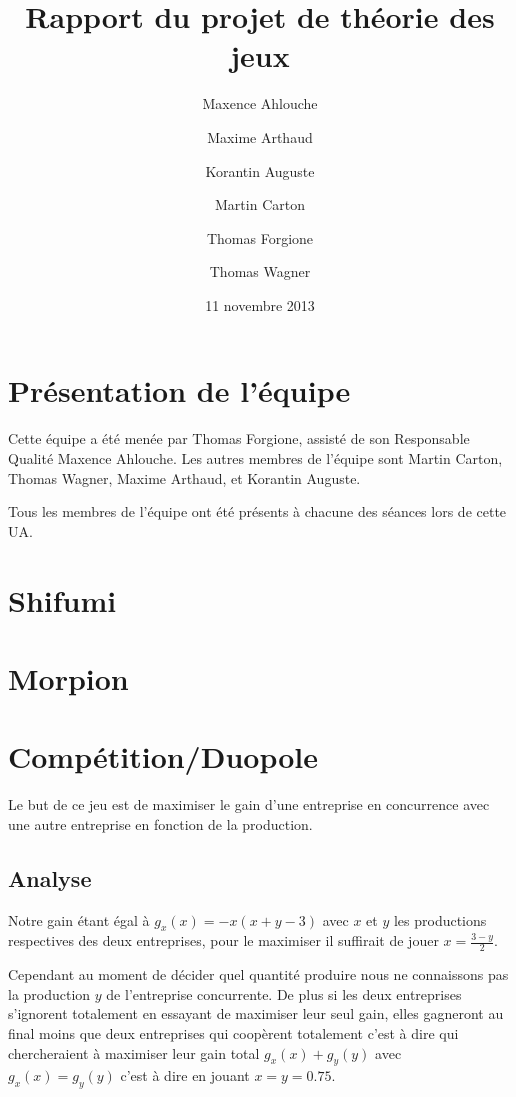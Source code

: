 \documentclass{scrartcl}
\begin{document}
\title{Rapport du projet de théorie des jeux}
\author{Maxence Ahlouche \and Maxime Arthaud \and Korantin Auguste
          \and Martin Carton \and Thomas Forgione \and Thomas Wagner}
\date{11 novembre 2013}
\maketitle
\tableofcontents
\lstlistoflistings
\newpage

\section{Présentation de l'équipe}
  Cette équipe a été menée par Thomas Forgione, assisté de son Responsable
  Qualité Maxence Ahlouche. Les autres membres de l'équipe sont Martin Carton,
  Thomas Wagner, Maxime Arthaud, et Korantin Auguste.

  Tous les membres de l'équipe ont été présents à chacune des séances lors de
  cette UA.

\section{Shifumi}
\section{Morpion}
\section{Compétition/Duopole}
  Le but de ce jeu est de maximiser le gain d'une entreprise en concurrence
  avec une autre entreprise en fonction de la production.

  \subsection{Analyse}
    Notre gain étant égal à $g_x(x) = -x(x+y-3)$ avec $x$ et $y$ les
    productions respectives des deux entreprises, pour le maximiser il
    suffirait de jouer $x=\frac{3-y}{2}$.
    
    Cependant au moment de décider quel quantité produire nous ne connaissons
    pas la production $y$ de l'entreprise concurrente. De plus si les deux
    entreprises s'ignorent totalement en essayant de maximiser leur seul gain,
    elles gagneront au final moins que deux entreprises qui coopèrent
    totalement c'est à dire qui chercheraient à maximiser leur gain total
    $g_x(x)+g_y(y)$ avec $g_x(x) = g_y(y)$ c'est à dire en jouant $x=y=0.75$.
\end{document}
